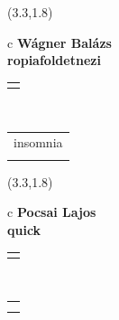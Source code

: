 \documentclass[11pt]{article}
\begin{document}
\makebox(3.3,1.8){
  \renewcommand\arraystretch{1.3}
  \begin{tabular}[c]{c}
    \hspace{8.5mm}
    \LARGE\bf{ Wágner Balázs }\\
    \hspace{8.5mm}
    \Large{ ropiafoldetnezi }\\
    \renewcommand\arraystretch{3}
    \begin{tabular}[c]{c}
      \centering
      \fontfamily{phv}\selectfont{
        \textbf{
          \textsc{
            \scriptsize{
            \color{Dark}{ Ismerkedő }\color{Bright}{ Webmester }\color{Bright}{ Sminkmester }\color{Bright}{ Programozó }
            }
          }
        }
      }
    \end{tabular}
    \\
    \renewcommand\arraystretch{1}
    \begin{tabular}{p{3.3in}}
      \hspace{.7cm}insomnia\\
      \hspace{.7cm}\emph{  }\\
    \end{tabular}
  \end{tabular}
}

\makebox(3.3,1.8){
  \renewcommand\arraystretch{1.3}
  \begin{tabular}[c]{c}
    \hspace{8.5mm}
    \LARGE\bf{ Pocsai Lajos }\\
    \hspace{8.5mm}
    \Large{ quick }\\
    \renewcommand\arraystretch{3}
    \begin{tabular}[c]{c}
      \centering
      \fontfamily{phv}\selectfont{
        \textbf{
          \textsc{
            \scriptsize{
            \color{Dark}{ Ismerkedő }\color{Bright}{ Webmester }\color{Bright}{ Sminkmester }\color{Bright}{ Programozó }
            }
          }
        }
      }
    \end{tabular}
    \\
    \renewcommand\arraystretch{1}
    \begin{tabular}{p{3.3in}}
      \hspace{.7cm}\\
      \hspace{.7cm}\emph{  }\\
    \end{tabular}
  \end{tabular}
}
\end{document}
